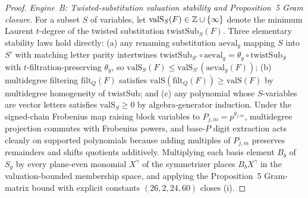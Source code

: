 \begin{proof}
\medskip\noindent
\emph{Engine~B: Twisted-substitution valuation stability and Proposition~5 Gram closure.}
For a subset $S$ of variables, let $\mathrm{valS}_S(F) \in \mathbb{Z} \cup \{\infty\}$ denote the minimum Laurent $t$-degree of the twisted substitution $\mathrm{twistSub}_S(F)$. Three elementary stability laws hold directly:
(a) any renaming substitution $\mathrm{aeval}_g$ mapping $S$ into $S'$ with matching letter parity intertwines $\mathrm{twistSub}_{S'} \circ \mathrm{aeval}_g = \theta_g \circ \mathrm{twistSub}_S$ with $t$-filtration-preserving $\theta_g$, so $\mathrm{valS}_S(F) \le \mathrm{valS}_{S'}(\mathrm{aeval}_g(F))$;
(b) multidegree filtering $\mathrm{filt}_Q(F)$ satisfies $\mathrm{valS}(\mathrm{filt}_Q(F)) \ge \mathrm{valS}(F)$ by multidegree homogeneity of $\mathrm{twistSub}$; and
(c) any polynomial whose $S$-variables are vector letters satisfies $\mathrm{valS}_S \ge 0$ by algebra-generator induction.
Under the signed-chain Frobenius map raising block variables to $P_{j,m} = p^{g_{j,m}}$, multidegree projection commutes with Frobenius powers, and base-$P$ digit extraction acts cleanly on supported polynomials because adding multiples of $P_{j,m}$ preserves remainders and shifts quotients additively. Multiplying each basis element $B_b$ of $S_g$ by every plane-even monomial $X^\gamma$ of the symmetrizer places $B_b X^\gamma$ in the valuation-bounded membership space, and applying the Proposition~5 Gram-matrix bound with explicit constants $(26, 2, 24, 60)$ closes (i).


\end{proof}
